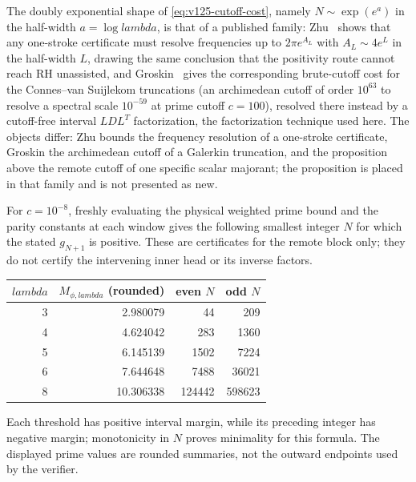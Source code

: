 \documentclass[11pt]{article}
\def\lambda{lambda}%
\theoremstyle{remark}
\begin{document}
The doubly exponential shape of \eqref{eq:v125-cutoff-cost}, namely
$N\sim\exp(e^{a})$ in the half-width $a=\log\lambda$, is that of a
published family: Zhu~\cite{Zhu2026} shows that any one-stroke
certificate must resolve frequencies up to $2\pi e^{A_L}$ with
$A_L\sim4e^{L}$ in the half-width $L$, drawing the same conclusion that
the positivity route cannot reach RH unassisted, and
Groskin~\cite{Groskin2026} gives the corresponding brute-cutoff cost
for the Connes--van Suijlekom truncations (an archimedean cutoff of
order $10^{63}$ to resolve a spectral scale $10^{-59}$ at prime cutoff
$c=100$), resolved there instead by a cutoff-free interval $LDL^{T}$
factorization, the factorization technique used here.
The objects differ: Zhu bounds the frequency resolution of a
one-stroke certificate, Groskin the archimedean cutoff of a Galerkin
truncation, and the proposition above the remote cutoff of one specific
scalar majorant; the proposition is placed in that family and is not
presented as new.

For $c=10^{-8}$, freshly evaluating the physical weighted prime bound
and the parity constants at each window gives the following smallest
integer $N$ for which the stated $g_{N+1}$ is positive.  These are
certificates for the remote block only; they do not certify the
intervening inner head or its inverse factors.
\begin{center}
\begin{tabular}{rrrr}
\toprule
$\lambda$ & $M_{\phi,\lambda}$ (rounded) & even $N$ & odd $N$\\
\midrule
3&2.980079&44&209\\
4&4.624042&283&1360\\
5&6.145139&1502&7224\\
6&7.644648&7488&36021\\
8&10.306338&124442&598623\\
\bottomrule
\end{tabular}
\end{center}
Each threshold has positive interval margin, while its preceding
integer has negative margin; monotonicity in $N$ proves minimality
for this formula.  The displayed prime values are rounded summaries,
not the outward endpoints used by the verifier.
\end{document}
